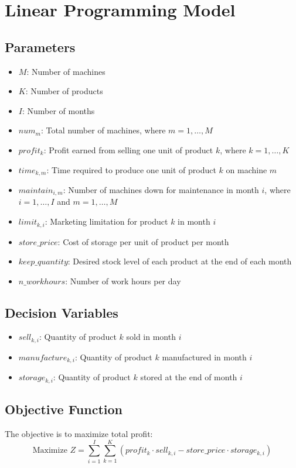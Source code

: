 \documentclass{article}
\begin{document}
\section*{Linear Programming Model}

\subsection*{Parameters}
\begin{itemize}
    \item $M$: Number of machines
    \item $K$: Number of products
    \item $I$: Number of months
    \item $num_m$: Total number of machines, where $m = 1, \ldots, M$
    \item $profit_k$: Profit earned from selling one unit of product $k$, where $k = 1, \ldots, K$
    \item $time_{k,m}$: Time required to produce one unit of product $k$ on machine $m$
    \item $maintain_{i,m}$: Number of machines down for maintenance in month $i$, where $i = 1, \ldots, I$ and $m = 1, \ldots, M$
    \item $limit_{k,i}$: Marketing limitation for product $k$ in month $i$
    \item $store\_price$: Cost of storage per unit of product per month
    \item $keep\_quantity$: Desired stock level of each product at the end of each month
    \item $n\_workhours$: Number of work hours per day
\end{itemize}

\subsection*{Decision Variables}
\begin{itemize}
    \item $sell_{k,i}$: Quantity of product $k$ sold in month $i$
    \item $manufacture_{k,i}$: Quantity of product $k$ manufactured in month $i$
    \item $storage_{k,i}$: Quantity of product $k$ stored at the end of month $i$
\end{itemize}

\subsection*{Objective Function}
The objective is to maximize total profit:
\[
\text{Maximize } Z = \sum_{i=1}^{I} \sum_{k=1}^{K} (profit_k \cdot sell_{k,i} - store\_price \cdot storage_{k,i})
\]
\end{document}
